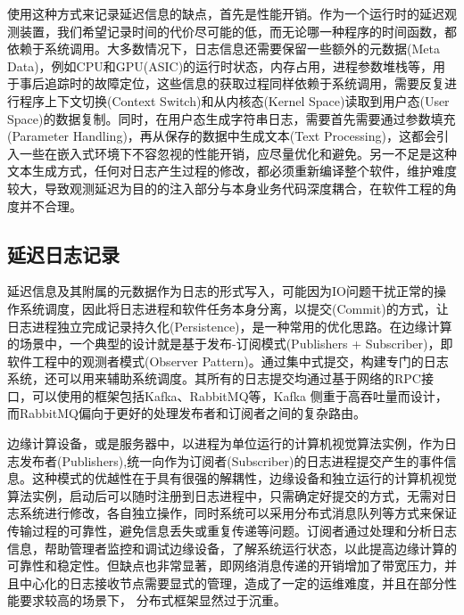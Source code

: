 \documentclass[master,anonymous]{shtthesis}
\begin{document}
使用这种方式来记录延迟信息的缺点，首先是性能开销。作为一个运行时的延迟观测装置，我们希望记录时间的代价尽可能的低，而无论哪一种程序的时间函数，都依赖于系统调用。大多数情况下，日志信息还需要保留一些额外的元数据(Meta Data)，例如CPU和GPU(ASIC)的运行时状态，内存占用，进程参数堆栈等，用于事后追踪时的故障定位，这些信息的获取过程同样依赖于系统调用，需要反复进行程序上下文切换(Context Switch)和从内核态(Kernel Space)读取到用户态(User Space)的数据复制。同时，在用户态生成字符串日志，需要首先需要通过参数填充(Parameter Handling)，再从保存的数据中生成文本(Text Processing)，这都会引入一些在嵌入式环境下不容忽视的性能开销，应尽量优化和避免。另一不足是这种文本生成方式，任何对日志产生过程的修改，都必须重新编译整个软件，维护难度较大，导致观测延迟为目的的注入部分与本身业务代码深度耦合，在软件工程的角度并不合理。

\subsection{延迟日志记录}\label{延迟日志记录}
延迟信息及其附属的元数据作为日志的形式写入，可能因为IO问题干扰正常的操作系统调度，因此将日志进程和软件任务本身分离，以提交(Commit)的方式，让日志进程独立完成记录持久化(Persistence)，是一种常用的优化思路。在边缘计算的场景中，一个典型的设计就是基于发布-订阅模式(Publishers + Subscriber)，即软件工程中的观测者模式(Observer Pattern)。通过集中式提交，构建专门的日志系统，还可以用来辅助系统调度。其所有的日志提交均通过基于网络的RPC接口，可以使用的框架包括Kafka\cite{kreps2011kafka}、RabbitMQ等，Kafka 侧重于高吞吐量而设计，而RabbitMQ偏向于更好的处理发布者和订阅者之间的复杂路由\cite{dobbelaere2017kafka}。


边缘计算设备，或是服务器中，以进程为单位运行的计算机视觉算法实例，作为日志发布者(Publishers),统一向作为订阅者(Subscriber)的日志进程提交产生的事件信息。这种模式的优越性在于具有很强的解耦性，边缘设备和独立运行的计算机视觉算法实例，启动后可以随时注册到日志进程中，只需确定好提交的方式，无需对日志系统进行修改，各自独立操作，同时系统可以采用分布式消息队列等方式来保证传输过程的可靠性，避免信息丢失或重复传递等问题。订阅者通过处理和分析日志信息，帮助管理者监控和调试边缘设备，了解系统运行状态，以此提高边缘计算的可靠性和稳定性。但缺点也非常显著，即网络消息传递的开销增加了带宽压力，并且中心化的日志接收节点需要显式的管理，造成了一定的运维难度，并且在部分性能要求较高的场景下，
分布式框架显然过于沉重。
\end{document}
